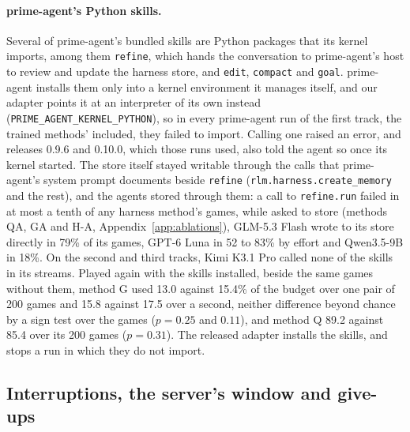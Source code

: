 \paragraph{prime-agent's Python skills.} Several of prime-agent's bundled skills are Python packages that its kernel imports, among them \texttt{refine}, which hands the conversation to prime-agent's host to review and update the harness store, and \texttt{edit}, \texttt{compact} and \texttt{goal}. prime-agent installs them only into a kernel environment it manages itself, and our adapter points it at an interpreter of its own instead (\texttt{PRIME\_AGENT\_KERNEL\_PYTHON}), so in every prime-agent run of the first track, the trained methods' included, they failed to import. Calling one raised an error, and releases 0.9.6 and 0.10.0, which those runs used, also told the agent so once its kernel started. The store itself stayed writable through the calls that prime-agent's system prompt documents beside \texttt{refine} (\texttt{rlm.harness.create\_memory} and the rest), and the agents stored through them: a call to \texttt{refine.run} failed in at most a tenth of any harness method's games, while asked to store (methods QA, GA and \mbox{H-A}, Appendix~\ref{app:ablations}), GLM-5.3 Flash wrote to its store directly in 79\% of its games, GPT-6 Luna in 52 to 83\% by effort and Qwen3.5-9B in 18\%. On the second and third tracks, Kimi K3.1 Pro called none of the skills in its streams. Played again with the skills installed, beside the same games without them, method G used 13.0 against 15.4\% of the budget over one pair of 200 games and 15.8 against 17.5 over a second, neither difference beyond chance by a sign test over the games ($p = 0.25$ and $0.11$), and method Q 89.2 against 85.4 over its 200 games ($p = 0.31$). The released adapter installs the skills, and stops a run in which they do not import.

\subsection{Interruptions, the server's window and give-ups}

